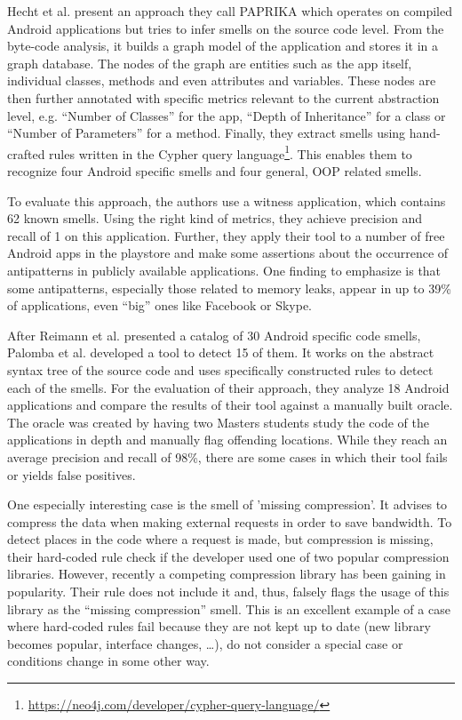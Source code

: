 Hecht et al. \cite{hecht2015detecting} present an approach they call PAPRIKA which operates on compiled Android applications but tries to infer smells on the source code level.
From the byte-code analysis, it builds a graph model of the application and stores it in a graph database.
The nodes of the graph are entities such as the app itself, individual classes, methods and even attributes and variables.
These nodes are then further annotated with specific metrics relevant to the current abstraction level, e.g. ``Number of Classes'' for the app, ``Depth of Inheritance'' for a class or ``Number of Parameters'' for a method.
Finally, they extract smells using hand-crafted rules written in the Cypher query language\footnote{\url{https://neo4j.com/developer/cypher-query-language/}}.
This enables them to recognize four Android specific smells and four general, OOP related smells.

To evaluate this approach, the authors use a witness application, which contains 62 known smells.
Using the right kind of metrics, they achieve precision and recall of 1 on this application.
Further, they apply their tool to a number of free Android apps in the playstore and make some assertions about the occurrence of antipatterns in publicly available applications.
One finding to emphasize is that some antipatterns, especially those related to memory leaks, appear in up to 39\% of applications, even ``big'' ones like Facebook or Skype.

After Reimann et al. \cite{reimann2014tool} presented a catalog of 30 Android specific code smells, Palomba et al. \cite{palomba2017lightweight} developed a tool to detect 15 of them.
It works on the abstract syntax tree of the source code and uses specifically constructed rules to detect each of the smells.
For the evaluation of their approach, they analyze 18 Android applications and compare the results of their tool against a manually built oracle.
The oracle was created by having two Masters students study the code of the applications in depth and manually flag offending locations.
While they reach an average precision and recall of 98\%, there are some cases in which their tool fails or yields false positives.

One especially interesting case is the smell of 'missing compression'.
It advises to compress the data when making external requests in order to save bandwidth.
To detect places in the code where a request is made, but compression is missing, their hard-coded rule check if the developer used one of two popular compression libraries.
However, recently a competing compression library has been gaining in popularity.
Their rule does not include it and, thus, falsely flags the usage of this library as the ``missing compression'' smell.
This is an excellent example of a case where hard-coded rules fail because they are not kept up to date (new library becomes popular, interface changes, \ldots), do not consider a special case or conditions change in some other way.

